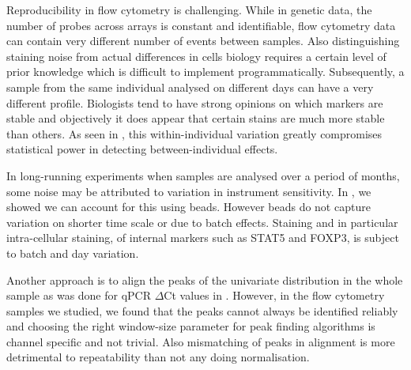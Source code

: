 Reproducibility in flow cytometry is challenging.
While in genetic data, the number of probes across arrays is constant and identifiable,
flow cytometry data can contain very different number of events between samples.
Also distinguishing staining noise from actual differences in cells biology requires a certain level of prior knowledge which is difficult to implement programmatically.
Subsequently, a sample from the same individual analysed on different days can have a very different profile.
Biologists tend to have strong opinions on which markers are stable and objectively it does appear that certain stains are much more stable than others.
As seen in , this within-individual variation greatly compromises statistical power in detecting between-individual effects.

In long-running experiments when samples are analysed over a period of months, some noise may be attributed to variation in instrument sensitivity.
In , we showed we can account for this using beads.
However beads do not capture variation on shorter time scale or due to batch effects.
Staining and in particular intra-cellular staining, of internal markers such as STAT5 and FOXP3, is subject to batch and day variation.

Another approach is to align the peaks of the univariate distribution in the whole sample as was done for qPCR $\Delta$Ct values in .
However, in the flow cytometry samples we studied, we found that the peaks cannot always be identified reliably and choosing the right window-size parameter for peak finding algorithms is channel specific and not trivial.
Also mismatching of peaks in alignment is more detrimental to repeatability than not any doing normalisation.






